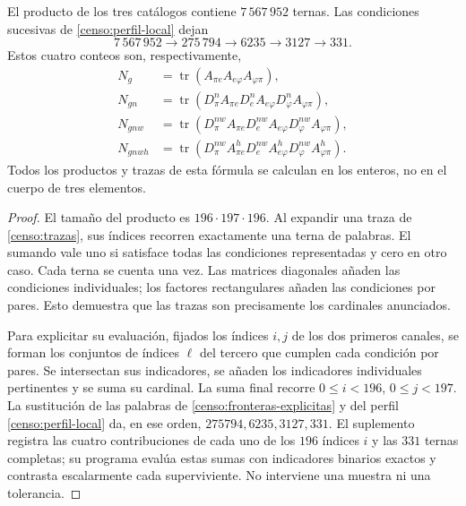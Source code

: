 \begin{theorem}
\label{censo:teorema-conteo}
El producto de los tres catálogos contiene \(7\,567\,952\) ternas.
Las condiciones sucesivas de \eqref{censo:perfil-local} dejan
\begin{equation}
 7\,567\,952\longrightarrow275\,794\longrightarrow6235
 \longrightarrow3127\longrightarrow331.
 \label{censo:cadena-local}
\end{equation}
Estos cuatro conteos son, respectivamente,
\begin{align}
 N_g&=\operatorname{tr}(A_{\pi e}A_{e\varphi}A_{\varphi\pi}),
 \nonumber\\
 N_{gn}&=\operatorname{tr}(D_\pi^n A_{\pi e}
             D_e^n A_{e\varphi}D_\varphi^n A_{\varphi\pi}),
 \nonumber\\
 N_{gnw}&=\operatorname{tr}(D_\pi^{nw} A_{\pi e}
             D_e^{nw} A_{e\varphi}D_\varphi^{nw} A_{\varphi\pi}),
 \nonumber\\
 N_{gnwh}&=\operatorname{tr}(D_\pi^{nw} A^h_{\pi e}
             D_e^{nw} A^h_{e\varphi}D_\varphi^{nw} A^h_{\varphi\pi}).
 \label{censo:trazas}
\end{align}
Todos los productos y trazas de esta fórmula se calculan en los enteros,
no en el cuerpo de tres elementos.
\end{theorem}
\begin{proof}
El tamaño del producto es \(196\cdot197\cdot196\). Al expandir
una traza de \eqref{censo:trazas}, sus índices recorren exactamente una
terna de palabras. El sumando vale uno si satisface todas las condiciones
representadas y cero en otro caso. Cada terna se cuenta una vez.
Las matrices diagonales añaden las condiciones individuales; los factores
rectangulares añaden las condiciones por pares. Esto demuestra que las
trazas son precisamente los cardinales anunciados.

Para explicitar su evaluación, fijados los índices \(i,j\) de los dos
primeros canales, se forman los conjuntos de índices \(\ell\) del tercero
que cumplen cada condición por pares. Se intersectan sus indicadores,
se añaden los indicadores individuales pertinentes y se suma su cardinal.
La suma final recorre \(0\leq i<196\), \(0\leq j<197\).
La sustitución de las palabras de \eqref{censo:fronteras-explicitas} y
del perfil \eqref{censo:perfil-local} da, en ese orden,
\(275794,6235,3127,331\). El suplemento registra las cuatro contribuciones
de cada uno de los \(196\) índices \(i\) y las \(331\) ternas completas;
su programa evalúa estas sumas con indicadores binarios exactos y contrasta
escalarmente cada superviviente. No interviene una muestra ni una tolerancia.
\end{proof}

